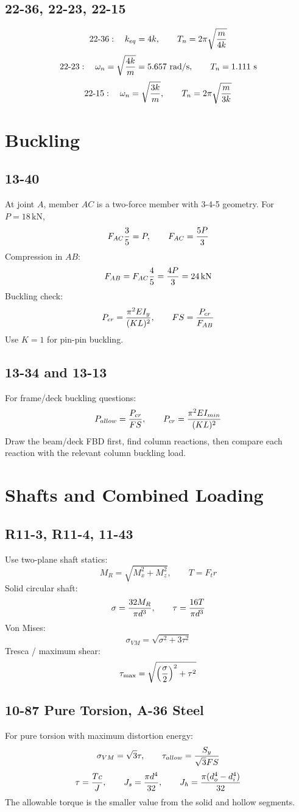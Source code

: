 \documentclass[11pt,a4paper]{article}
\newcommand{\kN}{\mathrm{kN}}
\begin{document}
\subsection*{22-36, 22-23, 22-15}
\[
22\text{-}36:\quad k_{eq}=4k,\qquad T_n=2\pi\sqrt{m\over4k}
\]
\[
22\text{-}23:\quad \omega_n=\sqrt{4k\over m}=5.657\ \mathrm{rad/s},\qquad T_n=1.111\ \mathrm{s}
\]
\[
22\text{-}15:\quad \omega_n=\sqrt{3k\over m},\qquad T_n=2\pi\sqrt{m\over3k}
\]

\section{Buckling}

\subsection*{13-40}
At joint \(A\), member \(AC\) is a two-force member with 3-4-5 geometry. For \(P=18\,\kN\),
\[
F_{AC}{3\over5}=P,\qquad F_{AC}={5P\over3}
\]
Compression in \(AB\):
\[
F_{AB}=F_{AC}{4\over5}={4P\over3}=24\,\kN
\]
Buckling check:
\[
P_{cr}={\pi^2EI_y\over(KL)^2},\qquad FS={P_{cr}\over F_{AB}}
\]
Use \(K=1\) for pin-pin buckling.

\subsection*{13-34 and 13-13}
For frame/deck buckling questions:
\[
P_{allow}={P_{cr}\over FS},\qquad
P_{cr}={\pi^2EI_{min}\over(KL)^2}
\]
Draw the beam/deck FBD first, find column reactions, then compare each reaction with the relevant column buckling load.

\section{Shafts and Combined Loading}

\subsection*{R11-3, R11-4, 11-43}
Use two-plane shaft statics:
\[
M_R=\sqrt{M_x^2+M_z^2},\qquad T=F_t r
\]
Solid circular shaft:
\[
\sigma={32M_R\over\pi d^3},\qquad
\tau={16T\over\pi d^3}
\]
Von Mises:
\[
\sigma_{VM}=\sqrt{\sigma^2+3\tau^2}
\]
Tresca / maximum shear:
\[
\tau_{\max}=\sqrt{\left({\sigma\over2}\right)^2+\tau^2}
\]

\subsection*{10-87 Pure Torsion, A-36 Steel}
For pure torsion with maximum distortion energy:
\[
\sigma_{VM}=\sqrt{3}\tau,\qquad
\tau_{allow}={S_y\over \sqrt{3}FS}
\]
\[
\tau={Tc\over J},\qquad
J_s={\pi d^4\over32},\qquad
J_h={\pi(d_o^4-d_i^4)\over32}
\]
The allowable torque is the smaller value from the solid and hollow segments.
\end{document}
